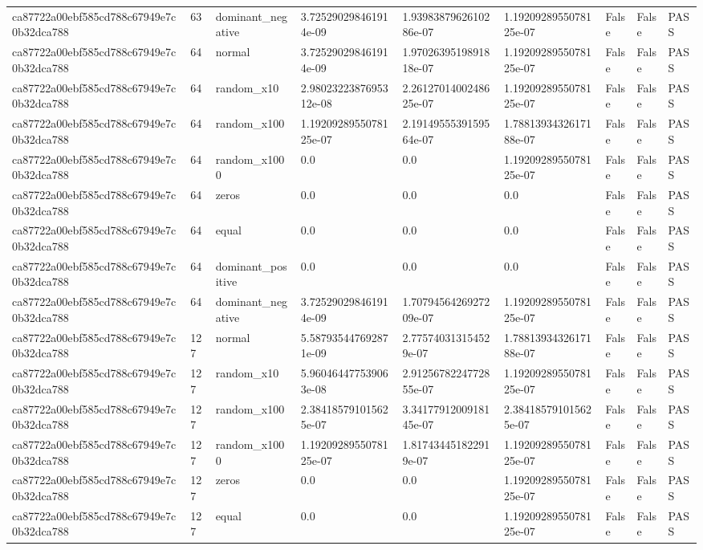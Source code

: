 \begin{tabular}{lllllllll}
ca87722a00ebf585cd788c67949e7c0b32dca788 & 63 & dominant\_negative & 3.725290298461914e-09 & 1.9398387962610286e-07 & 1.1920928955078125e-07 & False & False & PASS \\
ca87722a00ebf585cd788c67949e7c0b32dca788 & 64 & normal & 3.725290298461914e-09 & 1.9702639519891818e-07 & 1.1920928955078125e-07 & False & False & PASS \\
ca87722a00ebf585cd788c67949e7c0b32dca788 & 64 & random\_x10 & 2.9802322387695312e-08 & 2.2612701400248625e-07 & 1.1920928955078125e-07 & False & False & PASS \\
ca87722a00ebf585cd788c67949e7c0b32dca788 & 64 & random\_x100 & 1.1920928955078125e-07 & 2.1914955539159564e-07 & 1.7881393432617188e-07 & False & False & PASS \\
ca87722a00ebf585cd788c67949e7c0b32dca788 & 64 & random\_x1000 & 0.0 & 0.0 & 1.1920928955078125e-07 & False & False & PASS \\
ca87722a00ebf585cd788c67949e7c0b32dca788 & 64 & zeros & 0.0 & 0.0 & 0.0 & False & False & PASS \\
ca87722a00ebf585cd788c67949e7c0b32dca788 & 64 & equal & 0.0 & 0.0 & 0.0 & False & False & PASS \\
ca87722a00ebf585cd788c67949e7c0b32dca788 & 64 & dominant\_positive & 0.0 & 0.0 & 0.0 & False & False & PASS \\
ca87722a00ebf585cd788c67949e7c0b32dca788 & 64 & dominant\_negative & 3.725290298461914e-09 & 1.7079456426927209e-07 & 1.1920928955078125e-07 & False & False & PASS \\
ca87722a00ebf585cd788c67949e7c0b32dca788 & 127 & normal & 5.587935447692871e-09 & 2.775740313154529e-07 & 1.7881393432617188e-07 & False & False & PASS \\
ca87722a00ebf585cd788c67949e7c0b32dca788 & 127 & random\_x10 & 5.960464477539063e-08 & 2.9125678224772855e-07 & 1.1920928955078125e-07 & False & False & PASS \\
ca87722a00ebf585cd788c67949e7c0b32dca788 & 127 & random\_x100 & 2.384185791015625e-07 & 3.3417791200918145e-07 & 2.384185791015625e-07 & False & False & PASS \\
ca87722a00ebf585cd788c67949e7c0b32dca788 & 127 & random\_x1000 & 1.1920928955078125e-07 & 1.817434451822919e-07 & 1.1920928955078125e-07 & False & False & PASS \\
ca87722a00ebf585cd788c67949e7c0b32dca788 & 127 & zeros & 0.0 & 0.0 & 1.1920928955078125e-07 & False & False & PASS \\
ca87722a00ebf585cd788c67949e7c0b32dca788 & 127 & equal & 0.0 & 0.0 & 1.1920928955078125e-07 & False & False & PASS \\

\end{tabular}
